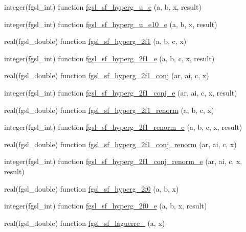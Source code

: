 \begin{DoxyCompactItemize}
integer(fgsl\-\_\-int) function \hyperlink{specfunc_8finc_aca06018149f6691b1145778b57e92a5f}{fgsl\-\_\-sf\-\_\-hyperg\-\_\-u\-\_\-e} (a, b, x, result)
\item 
integer(fgsl\-\_\-int) function \hyperlink{specfunc_8finc_a20c40edefef252ba75ecb8db90c3911d}{fgsl\-\_\-sf\-\_\-hyperg\-\_\-u\-\_\-e10\-\_\-e} (a, b, x, result)
\item 
real(fgsl\-\_\-double) function \hyperlink{specfunc_8finc_ab2fdce3ce4c3c756d86f5923d0051acb}{fgsl\-\_\-sf\-\_\-hyperg\-\_\-2f1} (a, b, c, x)
\item 
integer(fgsl\-\_\-int) function \hyperlink{specfunc_8finc_a6e3a3bc5ee5222671a75e63762558a90}{fgsl\-\_\-sf\-\_\-hyperg\-\_\-2f1\-\_\-e} (a, b, c, x, result)
\item 
real(fgsl\-\_\-double) function \hyperlink{specfunc_8finc_a9252e667b8b8e170248df6de4b007835}{fgsl\-\_\-sf\-\_\-hyperg\-\_\-2f1\-\_\-conj} (ar, ai, c, x)
\item 
integer(fgsl\-\_\-int) function \hyperlink{specfunc_8finc_ae90490f040c7ac25a292a19039b1f984}{fgsl\-\_\-sf\-\_\-hyperg\-\_\-2f1\-\_\-conj\-\_\-e} (ar, ai, c, x, result)
\item 
real(fgsl\-\_\-double) function \hyperlink{specfunc_8finc_ab27b61eccc2ba49afff5f6bc4872345a}{fgsl\-\_\-sf\-\_\-hyperg\-\_\-2f1\-\_\-renorm} (a, b, c, x)
\item 
integer(fgsl\-\_\-int) function \hyperlink{specfunc_8finc_a39eb4a4ce7e1167447fd344643f1e6b7}{fgsl\-\_\-sf\-\_\-hyperg\-\_\-2f1\-\_\-renorm\-\_\-e} (a, b, c, x, result)
\item 
real(fgsl\-\_\-double) function \hyperlink{specfunc_8finc_a311475a4efa7232c466604aa93181538}{fgsl\-\_\-sf\-\_\-hyperg\-\_\-2f1\-\_\-conj\-\_\-renorm} (ar, ai, c, x)
\item 
integer(fgsl\-\_\-int) function \hyperlink{specfunc_8finc_a4c8097d38f25f2b48187eb722c15d4d4}{fgsl\-\_\-sf\-\_\-hyperg\-\_\-2f1\-\_\-conj\-\_\-renorm\-\_\-e} (ar, ai, c, x, result)
\item 
real(fgsl\-\_\-double) function \hyperlink{specfunc_8finc_ae0a22f5a6e016aa56b54c6072b0ef4ff}{fgsl\-\_\-sf\-\_\-hyperg\-\_\-2f0} (a, b, x)
\item 
integer(fgsl\-\_\-int) function \hyperlink{specfunc_8finc_a4ac61401038582cac13f7f368a38bdc3}{fgsl\-\_\-sf\-\_\-hyperg\-\_\-2f0\-\_\-e} (a, b, x, result)
\item 
real(fgsl\-\_\-double) function \hyperlink{specfunc_8finc_a904e27e8ae4ffd91e2b851c13de7e1fe}{fgsl\-\_\-sf\-\_\-laguerre\-\_} (a, x)
\item 

\end{DoxyCompactItemize}
